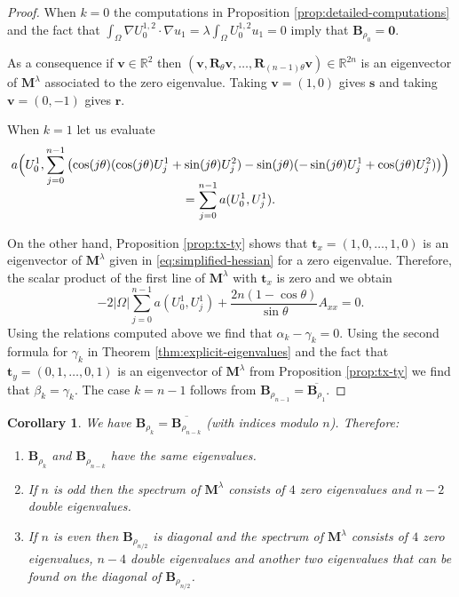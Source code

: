 \documentclass[JEP,XML,SOM,Unicode,ThmDefs,NoFloatCountersInSection,published]{cedram}
\theoremstyle{plain}
\newtheorem{cor}[thm]{Corollary}
\theoremstyle{definition}
\newcommand{\bo}[1]{{\boldsymbol#1}}
\let\Bbb\mathbb
\begin{document}
\begin{proof}
When $k=0$ the computations in Proposition \ref{prop:detailed-computations} and the fact that $\int_\Omega \nabla U_0^{1,2} \cdot \nabla u_1 = \lambda \int_\Omega U_0^{1,2} u_1 = 0$ imply that $\bo B_{\rho_0} = \bo 0$.

As a consequence if $\bo v \in \Bbb{R}^2$ then $(\bo v,\bo R_\theta\bo v,\dots,\bo R_{(n-1)\theta}\bo v) \in \Bbb{R}^{2n}$ is an eigenvector of $\bo M^{\lambda}$ associated to the zero eigenvalue. Taking $\bo v = (1,0)$ gives $\bo s$ and taking $\bo v = (0,-1)$ gives $\bo r$.

When $k=1$ let us evaluate
\vspace*{-5pt}
\begin{multline*}
a\Bigl(U_0^1,\sum_{j=0}^{n-1} \left(\cos(j\theta)(\cos(j\theta) U_j^1+\sin(j\theta)U_j^2) - \sin(j\theta)(-\sin (j\theta)U_j^1+\cos(j\theta)U_j^2)\right) \Bigr)\\[-8pt]
=\sum_{j=0}^{n-1} a(U_0^1,U_j^1).
\end{multline*}

On the other hand, Proposition \ref{prop:tx-ty} shows that $\bo t_x=(1,0,\dots,1,0)$ is an eigenvector of $\bo M^\lambda$ given in \ref{eq:simplified-hessian} for a zero eigenvalue. Therefore, the scalar product of the first line of $\bo M^\lambda$ with $\bo t_x$ is zero and we obtain
\[
-2|\Omega| \sum_{j=0}^{n-1} a(U_0^1,U_j^1) +\frac{2n(1-\cos \theta)}{\sin \theta} A_{xx} = 0.
\]
Using the relations computed above we find that $\alpha_k-\gamma_k=0$.
Using the second formula for $\gamma_k$ in Theorem \ref{thm:explicit-eigenvalues} and the fact that $\bo t_y= (0,1,\dots,0,1)$ is an eigenvector of $\bo M^\lambda$ from Proposition \ref{prop:tx-ty} we find that $\beta_k = \gamma_k$. The case $k=n-1$ follows from $\bo B_{\rho_{n-1}} = \overline{\bo B_{\rho_1}}$.
\end{proof}

\begin{cor}
We have $\bo B_{\rho_k} = \overline{\bo B_{\rho_{n-k}}}$ (with indices modulo $n$). Therefore:
\begin{enumerate}
\item
$\bo B_{\rho_k}$ and $\bo B_{\rho_{n-k}}$ have the same eigenvalues.

\item
If $n$ is odd then the spectrum of $\bo M^\lambda$ consists of $4$ zero eigenvalues and $n-2$ double eigenvalues.

\item
If $n$ is even then $\bo B_{\rho_{n/2}}$ is diagonal and the spectrum of $\bo M^\lambda$ consists of $4$ zero eigenvalues, $n-4$ double eigenvalues and another two eigenvalues that can be found on the diagonal of $\bo B_{\rho_{n/2}}$.
\end{enumerate}
\end{cor}
\end{document}
